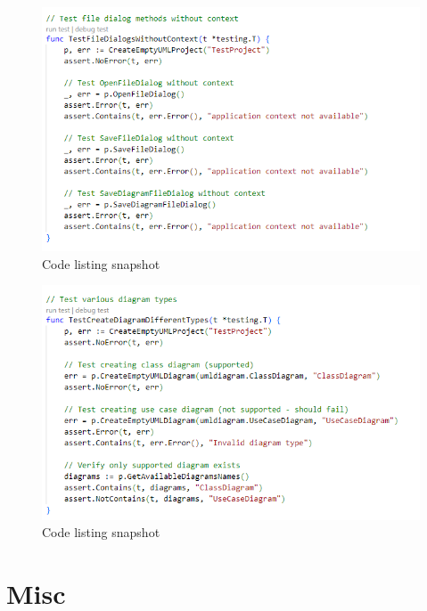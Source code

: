 \documentclass[12pt]{article}
\begin{document}
    \begin{figure}[H]
        \begin{center}
            \includegraphics[width=0.95\linewidth]
            {assets/hw7/test4.png}
            \caption{Code listing snapshot}
        \end{center}
    \end{figure}
    \begin{figure}[H]
        \begin{center}
            \includegraphics[width=0.95\linewidth]
            {assets/hw7/test5.png}
            \caption{Code listing snapshot}
        \end{center}
    \end{figure}




    \section{Misc}
\end{document}
